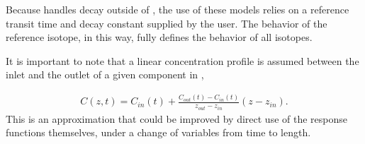 Because \Cyclus handles decay outside of \Cyder, the use of these models relies on a
reference transit time and decay constant supplied by the user. The behavior of
the reference isotope, in this way, fully defines the behavior of all isotopes.

It is important to note that a linear concentration profile is assumed between
the inlet and the outlet of a given component in \Cyder,

\begin{align}
  C(z,t) = C_{in}(t)  + \frac{C_{out}(t) - C_{in}(t)}{z_{out} - z_{in}}(z-z_{in}).
\end{align}
This is an approximation that could be improved by direct use of the response
functions themselves, under a change of variables from time to length.


